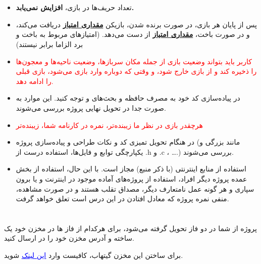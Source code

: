\documentclass[]{article}
\begin{document}
\section*{{}}
\begin{itemize}
    \item{
    تعداد حریف‌ها در بازی،
    \textbf{افزایش نمی‌یابد.}
    } 
    \item{ 
    پس از پایان هر بازی، در صورت برنده شدن، بازیکن
    \textbf{\underline{مقداری امتیاز}}
    دریافت می‌کند، و در صورت باخت،
    \textbf{\underline{مقداری امتیاز}}
    از دست می‌دهد. (امتیازهای مربوط به باخت و برد الزاما برابر نیستند)
    }
    \item{ 
    \textcolor{red}{کاربر باید بتواند وضعیت بازی از جمله مکان سرباز‌ها، وضعیت ناحیه‌ها و معجون‌ها را ذخیره کند و از بازی خارج شود، و وقتی که دوباره وارد بازی می‌شود، بازی قبلی را ادامه دهد.}
    }
    \item{ 
    در پیاده‌سازی کد خود به مصرف حافظه و بحث‌های
    و
    توجه کنید. این موارد به صورت جدا در تحویل نهایی پروژه بررسی می‌شوند.
    }
    \item{
    \textcolor{red}{هر‌چقدر بازی در نظر ما زیبنده‌تر، نمره در کارنامه شما، زیبنده‌تر
}
    }
    \item{
    در هنگام تحویل تمیزی کد و نکات طراحی و پیاده‌سازی پروژه (مانند بزرگی و یکپارچگی توابع و فایل‌ها، استفاده درست از .h و .c ، ….) بررسی می‌شوند.
    }


    \item{
استفاده از منابع اینترنتی (با ذکر منبع) مجاز است. با این حال، استفاده از بخش عمده پروژه دیگر افراد، استفاده از پروژه‌های آماده موجود در اینترنت و یا برون سپاری و هر گونه عمل نامتعارف دیگر، مصداق تقلب هستند و در صورت مشاهده، منفی نمره پروژه که معادل افتادن در این درس است تعلق خواهد گرفت.
}
\end{itemize}

\newpage


\section*{{}}

پروژه از شما در دو فاز تحویل گرفته می‌شود، برای هرکدام از فاز ها در مخزن
خود یک
ساخته و آدرس مخزن خود را در
ارسال کنید.

 برای ساختن این مخزن گیتهاب، کافیست وارد
\href{https://classroom.github.com/a/6YRnteBw}{\textcolor{blue}{\underline{این لینک}}} 
شوید.
\end{document}
